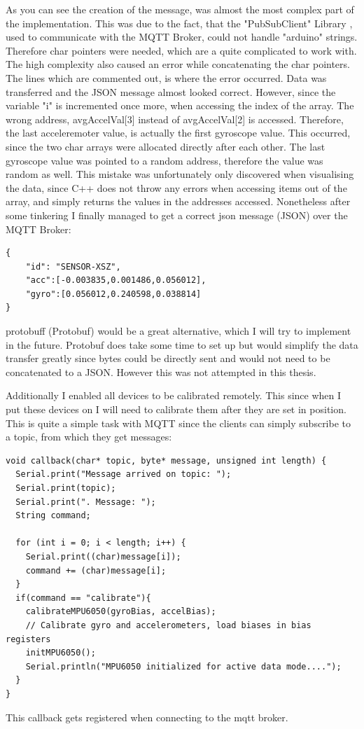 As you can see the creation of the message, was almost the most complex part of the implementation. This was due to the fact, that the "PubSubClient" Library \cite{knollear26:online}, used to communicate with the MQTT Broker, could not handle "arduino" strings. Therefore char pointers were needed, which are a quite complicated to work with. The high complexity also caused an error while concatenating the char pointers. The lines which are commented out, is where the error occurred. Data was transferred and the JSON message almost looked correct. However, since the variable "i" is incremented once more, when accessing the index of the array. The wrong address, avgAccelVal[3] instead of avgAccelVal[2] is accessed. Therefore, the last acceleremoter value, is actually the first gyroscope value. This occurred, since the two char arrays were allocated directly after each other. The last gyroscope value was pointed to a random address, therefore the value was random as well. 
This mistake was unfortunately only discovered when visualising the data, since C++ does not throw any errors when accessing items out of the array, and simply returns the values in the addresses accessed.
Nonetheless after some tinkering I finally managed to get a correct \acrshort{json} message (\gls{JSON}) over the MQTT Broker:

\begin{lstlisting}
{ 
    "id": "SENSOR-XSZ", 
    "acc":[-0.003835,0.001486,0.056012],
    "gyro":[0.056012,0.240598,0.038814]
}
\end{lstlisting}

\acrshort{protobuff} (\gls{Protobuf}) would be a great alternative, which I will try to implement in the future. Protobuf does take some time to set up but would simplify the data transfer greatly since bytes could be directly sent and would not need to be concatenated to a JSON. However this was not attempted in this thesis. 

Additionally I enabled all devices to be calibrated remotely. This since when I put these devices on I will need to calibrate them after they are set in position. This is quite a simple task with MQTT since the clients can simply subscribe to a topic, from which they get messages: 

\begin{lstlisting}
void callback(char* topic, byte* message, unsigned int length) {
  Serial.print("Message arrived on topic: ");
  Serial.print(topic);
  Serial.print(". Message: ");
  String command;
  
  for (int i = 0; i < length; i++) {
    Serial.print((char)message[i]);
    command += (char)message[i];
  }
  if(command == "calibrate"){
    calibrateMPU6050(gyroBias, accelBias); 
    // Calibrate gyro and accelerometers, load biases in bias registers  
    initMPU6050(); 
    Serial.println("MPU6050 initialized for active data mode....");
  }
}
\end{lstlisting}
This callback gets registered when connecting to the mqtt broker.

